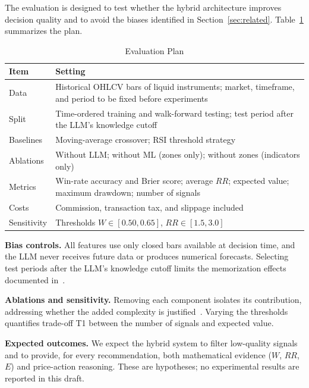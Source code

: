\documentclass[conference]{IEEEtran}
\begin{document}
The evaluation is designed to test whether the hybrid architecture improves decision quality and to avoid the biases identified in Section~\ref{sec:related}. Table~\ref{tab:eval} summarizes the plan.

\begin{table}[t]
\caption{Evaluation Plan}
\label{tab:eval}
\centering
\footnotesize
\setlength{\tabcolsep}{3pt}
\begin{tabular}{@{}p{}p{}@{}}
\toprule
Item & Setting \\
\midrule
Data & Historical OHLCV bars of liquid instruments; market, timeframe, and period to be fixed before experiments \\
Split & Time-ordered training and walk-forward testing; test period after the LLM's knowledge cutoff \\
Baselines & Moving-average crossover; RSI threshold strategy \\
Ablations & Without LLM; without ML (zones only); without zones (indicators only) \\
Metrics & Win-rate accuracy and Brier score; average $RR$; expected value; maximum drawdown; number of signals \\
Costs & Commission, transaction tax, and slippage included \\
Sensitivity & Thresholds $W \in [0.50, 0.65]$, $RR \in [1.5, 3.0]$ \\
\bottomrule
\end{tabular}
\end{table}

\textbf{Bias controls.} All features use only closed bars available at decision time, and the LLM never receives future data or produces numerical forecasts. Selecting test periods after the LLM's knowledge cutoff limits the memorization effects documented in~\cite{lopezlira2025memorization,gao2025lookahead,li2025profitmirage}.

\textbf{Ablations and sensitivity.} Removing each component isolates its contribution, addressing whether the added complexity is justified~\cite{li2025finsaber}. Varying the thresholds quantifies trade-off T1 between the number of signals and expected value.

\textbf{Expected outcomes.} We expect the hybrid system to filter low-quality signals and to provide, for every recommendation, both mathematical evidence ($W$, $RR$, $E$) and price-action reasoning. These are hypotheses; no experimental results are reported in this draft.
\end{document}
